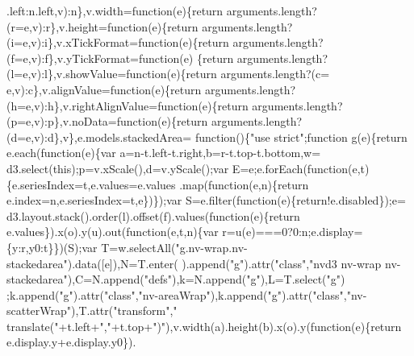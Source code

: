 \begin{DoxyCode}
      .left:n.left,v):n\},v.width=\textcolor{keyword}{function}(e)\{\textcolor{keywordflow}{return} arguments.length?(r=e,v):r\},v.height=\textcolor{keyword}{function}(e)\{\textcolor{keywordflow}{return} 
      arguments.length?(i=e,v):i\},v.xTickFormat=\textcolor{keyword}{function}(e)\{\textcolor{keywordflow}{return} arguments.length?(f=e,v):f\},v.yTickFormat=\textcolor{keyword}{function}(e)
      \{\textcolor{keywordflow}{return} arguments.length?(l=e,v):l\},v.showValue=\textcolor{keyword}{function}(e)\{\textcolor{keywordflow}{return} arguments.length?(c=
      e,v):c\},v.alignValue=\textcolor{keyword}{function}(e)\{\textcolor{keywordflow}{return} arguments.length?(h=e,v):h\},v.rightAlignValue=\textcolor{keyword}{function}(e)\{\textcolor{keywordflow}{return} 
      arguments.length?(p=e,v):p\},v.noData=\textcolor{keyword}{function}(e)\{\textcolor{keywordflow}{return} arguments.length?(d=e,v):d\},v\},e.models.stackedArea=\textcolor{keyword}{
      function}()\{\textcolor{stringliteral}{"use strict"};\textcolor{keyword}{function} g(e)\{\textcolor{keywordflow}{return} e.each(\textcolor{keyword}{function}(e)\{var a=n-t.left-t.right,b=r-t.top-t.bottom,w=
      d3.select(\textcolor{keyword}{this});p=v.xScale(),d=v.yScale();var E=e;e.forEach(\textcolor{keyword}{function}(e,t)\{e.seriesIndex=t,e.values=e.values
      .map(\textcolor{keyword}{function}(e,n)\{\textcolor{keywordflow}{return} e.index=n,e.seriesIndex=t,e\})\});var S=e.filter(\textcolor{keyword}{function}(e)\{\textcolor{keywordflow}{return}!e.disabled\});e=
      d3.layout.stack().order(l).offset(f).values(\textcolor{keyword}{function}(e)\{\textcolor{keywordflow}{return} e.values\}).x(o).y(u).out(\textcolor{keyword}{function}(e,t,n)\{var
       r=u(e)===0?0:n;e.display=\{y:r,y0:t\}\})(S);var T=w.selectAll(\textcolor{stringliteral}{"g.nv-wrap.nv-stackedarea"}).data([e]),N=T.enter(
      ).append(\textcolor{stringliteral}{"g"}).attr(\textcolor{stringliteral}{"class"},\textcolor{stringliteral}{"nvd3 nv-wrap nv-stackedarea"}),C=N.append(\textcolor{stringliteral}{"defs"}),k=N.append(\textcolor{stringliteral}{"g"}),L=T.select(\textcolor{stringliteral}{"g"})
      ;k.append(\textcolor{stringliteral}{"g"}).attr(\textcolor{stringliteral}{"class"},\textcolor{stringliteral}{"nv-areaWrap"}),k.append(\textcolor{stringliteral}{"g"}).attr(\textcolor{stringliteral}{"class"},\textcolor{stringliteral}{"nv-scatterWrap"}),T.attr(\textcolor{stringliteral}{"transform"},\textcolor{stringliteral}{"
      translate("}+t.left+\textcolor{stringliteral}{","}+t.top+\textcolor{stringliteral}{")"}),v.width(a).height(b).x(o).y(\textcolor{keyword}{function}(e)\{\textcolor{keywordflow}{return} e.display.y+e.display.y0\}).

\end{DoxyCode}
